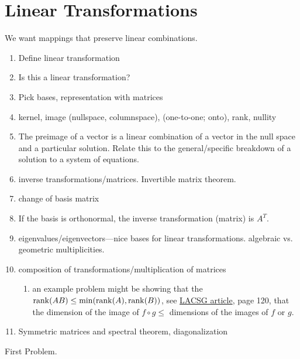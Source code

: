 \chapter{Linear Transformations}

We want mappings that preserve linear combinations.

\begin{enumerate}
\item Define linear transformation
\item Is this a linear transformation?
\item Pick bases, representation with matrices
\item kernel, image (nullspace, columnspace), (one-to-one; onto),
  rank, nullity
\item The preimage of a vector is a linear combination of a vector in
  the null space and a particular solution.  Relate this to the
  general/specific breakdown of a solution to a system of equations.
\item inverse transformations/matrices.  Invertible matrix theorem.
\item change of basis matrix
\item If the basis is orthonormal, the inverse transformation (matrix)
  is $A^T$.
\item eigenvalues/eigenvectors---nice bases for linear
  transformations.  algebraic vs. geometric multiplicities.
\item composition of transformations/multiplication of matrices
  \begin{enumerate}
  \item an example problem might be showing that the $\operatorname{rank}(AB)\leq
    \min(\operatorname{rank}(A), \operatorname{rank}(B))$, see
    \href{http://www.math.ucsd.edu/~harel/Downloadable/The%20Linear%20Algebra%20Curriculum%20Study%20Group%20Recommendations%20-%20Moving%20Beyond%20Concept%20Definition.pdf}{LACSG article}, page 120, that the dimension of the image of $f\circ g \leq$ dimensions of the images of $f$ or $g$.

  \end{enumerate}
\item Symmetric matrices and spectral theorem, diagonalization
\end{enumerate}

\begin{problem}
  First Problem.
\end{problem}



